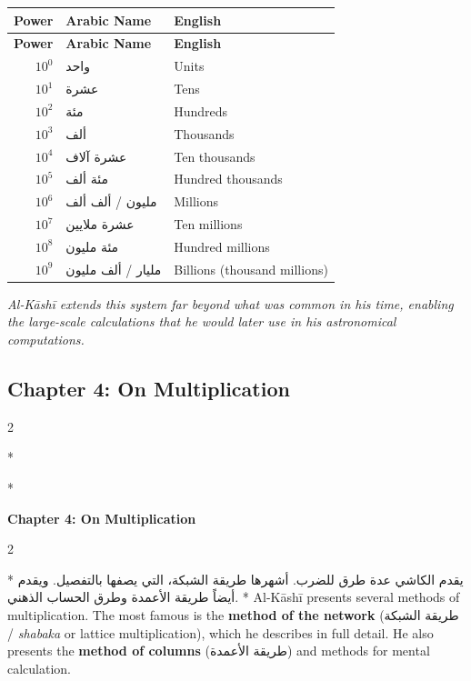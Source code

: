 \documentclass[11pt,a4paper]{article}
\newcommand{\cnote}[1]{\textcolor{notecolor}{\textit{#1}}}
\newcommand{\ar}[1]{{\arabicfont\beginR #1\endR}}
\newenvironment{bilingual}{%
  \vspace{0.3em}%
  \begin{paracol}{2}%
}{%
  \end{paracol}%
  \vspace{0.3em}%
}
\begin{document}
\begin{longtable}{|r|l|l|}
\hline
\textbf{Power} & \textbf{Arabic Name} & \textbf{English} \\
\hline
\endfirsthead
\hline
\textbf{Power} & \textbf{Arabic Name} & \textbf{English} \\
\hline
\endhead
$10^0$ & \ar{واحد} & Units \\
\hline
$10^1$ & \ar{عشرة} & Tens \\
\hline
$10^2$ & \ar{مئة} & Hundreds \\
\hline
$10^3$ & \ar{ألف} & Thousands \\
\hline
$10^4$ & \ar{عشرة آلاف} & Ten thousands \\
\hline
$10^5$ & \ar{مئة ألف} & Hundred thousands \\
\hline
$10^6$ & \ar{مليون} / \ar{ألف ألف} & Millions \\
\hline
$10^7$ & \ar{عشرة ملايين} & Ten millions \\
\hline
$10^8$ & \ar{مئة مليون} & Hundred millions \\
\hline
$10^9$ & \ar{مليار} / \ar{ألف مليون} & Billions (thousand millions) \\
\hline
\end{longtable}

\cnote{Al-K\=ash\=i extends this system far beyond what was common in his
time, enabling the large-scale calculations that he would later use in
his astronomical computations.}

\subsection{Chapter 4: On Multiplication}

\begin{bilingual}
\switchcolumn[0]*
\begin{center}
\textbf{\color{chapcolor}\ar{فصل في الضرب وطرقه}}
\end{center}
\switchcolumn[1]*
\begin{center}
\textbf{\color{chapcolor}Chapter 4: On Multiplication}
\end{center}
\end{bilingual}

\begin{bilingual}
\switchcolumn[0]*
\ar{يقدم الكاشي عدة طرق للضرب. أشهرها طريقة الشبكة، التي يصفها بالتفصيل. ويقدم أيضاً طريقة الأعمدة وطرق الحساب الذهني.}
\switchcolumn[1]*
Al-K\=ash\=i presents several methods of multiplication. The most famous is
the \textbf{method of the network} (\ar{طريقة الشبكة} /
\textit{shabaka} or lattice multiplication), which he describes in full
detail. He also presents the \textbf{method of columns}
(\ar{طريقة الأعمدة}) and methods for mental calculation.
\end{bilingual}
\end{document}
